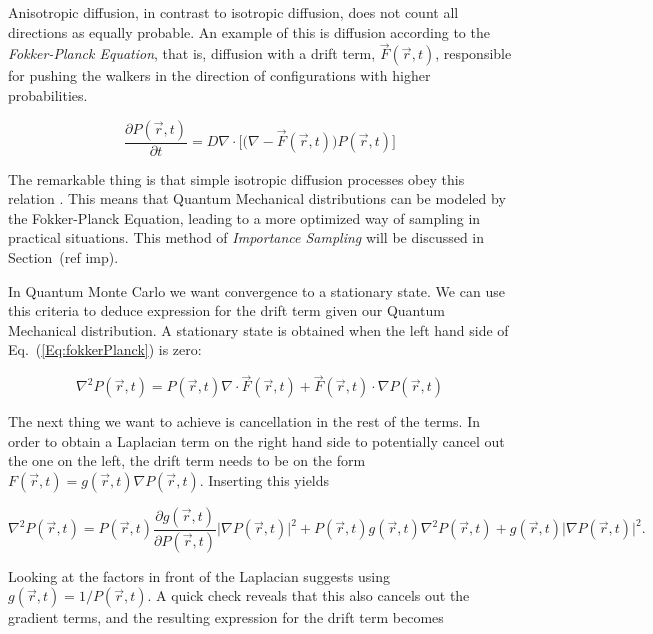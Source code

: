 Anisotropic diffusion, in contrast to isotropic diffusion, does not count all directions as equally probable. An example of this is diffusion according to the \textit{Fokker-Planck Equation}, that is, diffusion with a drift term, $\vec F(\vec r, t)$, responsible for pushing the walkers in the direction of configurations with higher probabilities.

\begin{equation}
 \frac{\partial P(\vec r, t)}{\partial t} = D\nabla\cdot\Big[\Big(\nabla - \vec F(\vec r, t)\Big) P(\vec r, t)\Big] 
 \label{Eq:fokkerPlanck}
\end{equation}

The remarkable thing is that simple isotropic diffusion processes obey this relation \cite{abInitioMC}. This means that Quantum Mechanical distributions can be modeled by the Fokker-Planck Equation, leading to a more optimized way of sampling in practical situations. This method of \textit{Importance Sampling} will be discussed in Section~(ref imp). 

In Quantum Monte Carlo we want convergence to a stationary state. We can use this criteria to deduce expression for the drift term given our Quantum Mechanical distribution. A stationary state is obtained when the left hand side of Eq.~(\ref{Eq:fokkerPlanck}) is zero:

\begin{equation*}
 \nabla^2 P(\vec r, t) = P(\vec r, t)\nabla\cdot\vec F(\vec r, t) + \vec F(\vec r, t) \cdot \nabla P(\vec r, t)
\end{equation*}

The next thing we want to achieve is cancellation in the rest of the terms. In order to obtain a Laplacian term on the right hand side to potentially cancel out the one on the left, the drift term needs to be on the form $F(\vec r, t) = g(\vec r, t)\nabla P(\vec r, t)$. Inserting this yields

\begin{equation*}
  \nabla^2 P(\vec r, t) = P(\vec r, t)\frac{\partial g(\vec r, t)}{\partial P(\vec r, t)}\Big|\nabla P(\vec r, t)\Big|^2
  + P(\vec r, t)g(\vec r, t)\nabla^2 P(\vec r, t) + g(\vec r, t) \Big|\nabla P(\vec r, t)\Big|^2.
\end{equation*}

Looking at the factors in front of the Laplacian suggests using $g(\vec r, t) = 1/P(\vec r, t)$. A quick check reveals that this also cancels out the gradient terms, and the resulting expression for the drift term becomes


